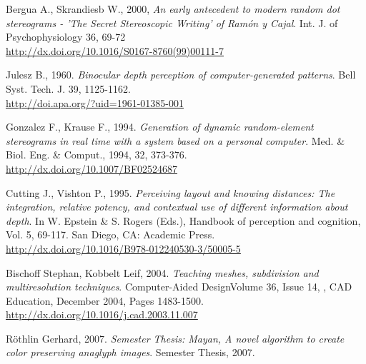 \begin{thebibliography}{12}
Bergua A., Skrandiesb W., 2000,
\textit{An early antecedent to modern random dot stereograms - 'The Secret Stereoscopic Writing' of Ram\'on y Cajal}.
Int. J. of Psychophysiology 36, 69-72\\
\url{http://dx.doi.org/10.1016/S0167-8760(99)00111-7}

Julesz B., 1960.
\textit{Binocular depth perception of computer-generated patterns}.
Bell Syst. Tech. J. 39, 1125-1162.\\
\url{http://doi.apa.org/?uid=1961-01385-001}

Gonzalez F., Krause F., 1994.
\textit{Generation of dynamic random-element stereograms in real time with a system based on a personal computer}.
Med. \& Biol. Eng. \& Comput., 1994, 32, 373-376.\\
\url{http://dx.doi.org/10.1007/BF02524687}

Cutting J., Vishton P., 1995.
\textit{Perceiving layout and knowing distances: The integration, relative potency, and contextual use of different information about depth}.
In W. Epstein \& S. Rogers (Eds.), Handbook of perception and cognition, Vol. 5, 69-117. San Diego, CA: Academic Press.\\
\url{http://dx.doi.org/10.1016/B978-012240530-3/50005-5}

Bischoff Stephan, Kobbelt Leif, 2004.
\textit{Teaching meshes, subdivision and multiresolution techniques}.
Computer-Aided DesignVolume 36, Issue 14, , CAD Education, December 2004, Pages 1483-1500.\\
\url{http://dx.doi.org/10.1016/j.cad.2003.11.007}

R\"othlin Gerhard, 2007.
\textit{Semester Thesis: Mayan, A novel algorithm to create color preserving anaglyph images}.
Semester Thesis, 2007.

\end{thebibliography}

\renewcommand*\refname{Links}

